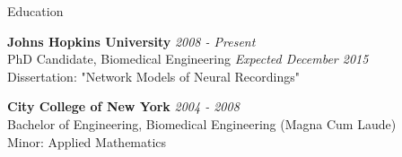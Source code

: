 \documentclass{resume} %
\begin{document}

\begin{rSection}{Education}
	
	{\bf Johns Hopkins University} \hfill {\em 2008 - Present} \\ 
	PhD Candidate, Biomedical Engineering \hfill {\em Expected December 2015} \\
	Dissertation: "Network Models of Neural Recordings"
	
	{\bf City College of New York} \hfill {\em 2004 - 2008} \\ 
	Bachelor of Engineering, Biomedical Engineering (Magna Cum Laude) \\
	Minor: Applied Mathematics

\end{rSection}

\end{document}
